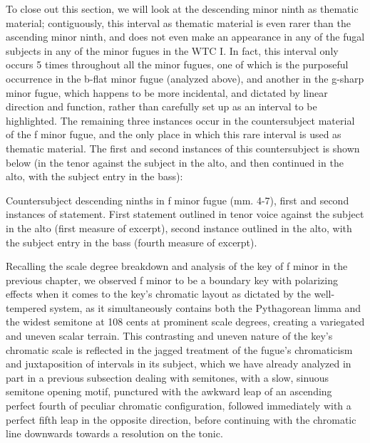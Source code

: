 To close out this section, we will look at the descending minor ninth as
thematic material; contiguously, this interval as thematic material is
even rarer than the ascending minor ninth, and does not even make an
appearance in any of the fugal subjects in any of the minor fugues in
the WTC I. In fact, this interval only occurs 5 times throughout all the
minor fugues, one of which is the purposeful occurrence in the b-flat
minor fugue (analyzed above), and another in the g-sharp minor fugue,
which happens to be more incidental, and dictated by linear direction
and function, rather than carefully set up as an interval to be
highlighted. The remaining three instances occur in the countersubject
material of the f minor fugue, and the only place in which this rare
interval is used as thematic material. The first and second instances of
this countersubject is shown below (in the tenor against the subject in
the alto, and then continued in the alto, with the subject entry in the
bass):



\begin{Example}[H]
\vspace{1.5em}
    \centering
    \caption[Countersubject descending ninths in f minor fugue (mm. 4-7). ]{ Countersubject descending ninths in f minor fugue (mm. 4-7), first and second instances of statement. First statement outlined in tenor voice against the subject in the alto (first measure of excerpt), second instance outlined in the alto, with the subject entry in the bass (fourth measure of excerpt).}
\end{Example}    
    Recalling the scale degree breakdown and analysis of the key of f minor
in the previous chapter, we observed f minor to be a boundary key with
polarizing effects when it comes to the key's chromatic layout as
dictated by the well-tempered system, as it simultaneously contains both
the Pythagorean limma and the widest semitone at 108 cents at prominent
scale degrees, creating a variegated and uneven scalar terrain. This
contrasting and uneven nature of the key's chromatic scale is reflected
in the jagged treatment of the fugue's chromaticism and juxtaposition of
intervals in its subject, which we have already analyzed in part in a
previous subsection dealing with semitones, with a slow, sinuous
semitone opening motif, punctured with the awkward leap of an ascending
perfect fourth of peculiar chromatic configuration, followed immediately
with a perfect fifth leap in the opposite direction, before continuing
with the chromatic line downwards towards a resolution on the tonic.

